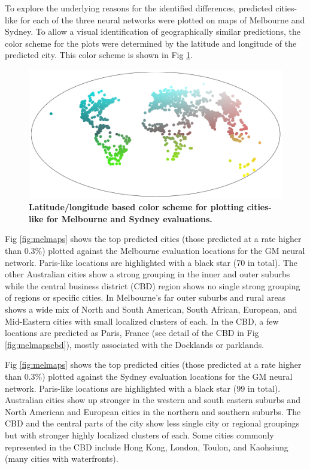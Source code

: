 \documentclass[10pt,letterpaper]{article}
\begin{document}
To explore the underlying reasons for the identified differences, predicted cities-like for each of the three neural networks were plotted on maps of Melbourne and Sydney. To allow a visual identification of geographically similar predictions, the color scheme for the plots were determined by the latitude and longitude of the predicted city. This color scheme is shown in Fig \ref{fig:colorscheme}. 


\begin{figure}[!htbp]
\centering    
\includegraphics[scale=0.25]{Images/PlosOne/Fig5.png} 
\caption{\bf Latitude/longitude based color scheme for plotting cities-like for Melbourne and Sydney evaluations.}    
 \label{fig:colorscheme}  
\end{figure} 


Fig \ref{fig:melmaps} shows the top predicted cities (those predicted at a rate higher than 0.3\%) plotted against the Melbourne evaluation locations for the GM neural network. Paris-like locations are highlighted with a black star (70 in total). The other Australian cities show a strong grouping in the inner and outer suburbs while the central business district (CBD) region shows no single strong grouping of regions or specific cities. In Melbourne's far outer suburbs and rural areas shows a wide mix of North and South American, South African, European, and Mid-Eastern cities with small localized clusters of each. In the CBD, a few locations are predicted as Paris, France (see detail of the CBD in Fig \ref{fig:melmapscbd}), mostly associated with the Docklands or parklands.

Fig \ref{fig:melmaps} shows the top predicted cities (those predicted at a rate higher than 0.3\%) plotted against the Sydney evaluation locations for the GM neural network. Paris-like locations are highlighted with a black star (99 in total).  Australian cities show up stronger in the western and south eastern suburbs and North American and European cities in the northern and southern suburbs. The CBD and the central parts of the city show less single city or regional groupings but with stronger highly localized clusters of each. Some cities commonly represented in the CBD include Hong Kong, London, Toulon, and Kaohsiung (many cities with waterfronts). 
\end{document}
